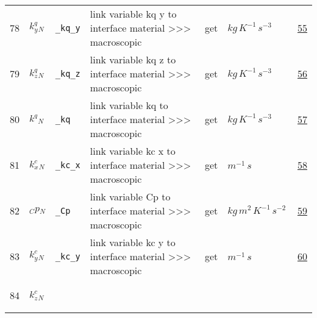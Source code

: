 \begin{longtable}{|p{1cm}|p{2.5cm}|p{4.5cm}|p{8cm}|p{3.0cm}|p{3cm}|p{1cm}|}
    78
             & \hypertarget{"v:78"}{ $ {{k^q_y}}{_{N}} $}
             & \verb|_kq_y|
             & link variable kq y to interface material >>> macroscopic
             & \begin{lay}get \end{lay}
             & $ kg \,K^{-1} \,s^{-3} \, $
             & \hyperlink{"e:55"}{ 55 }
                 \\
    79
             & \hypertarget{"v:79"}{ $ {{k^q_z}}{_{N}} $}
             & \verb|_kq_z|
             & link variable kq z to interface material >>> macroscopic
             & \begin{lay}get \end{lay}
             & $ kg \,K^{-1} \,s^{-3} \, $
             & \hyperlink{"e:56"}{ 56 }
                 \\
    80
             & \hypertarget{"v:80"}{ $ {{k^q}}{_{N}} $}
             & \verb|_kq|
             & link variable kq to interface material >>> macroscopic
             & \begin{lay}get \end{lay}
             & $ kg \,K^{-1} \,s^{-3} \, $
             & \hyperlink{"e:57"}{ 57 }
                 \\
    81
             & \hypertarget{"v:81"}{ $ {{k^c_x}}{_{N}} $}
             & \verb|_kc_x|
             & link variable kc x to interface material >>> macroscopic
             & \begin{lay}get \end{lay}
             & $ m^{-1} \,s \, $
             & \hyperlink{"e:58"}{ 58 }
                 \\
    82
             & \hypertarget{"v:82"}{ $ {_Cp}{_{N}} $}
             & \verb|_Cp|
             & link variable Cp to interface material >>> macroscopic
             & \begin{lay}get \end{lay}
             & $ kg \,m^{2} \,K^{-1} \,s^{-2} \, $
             & \hyperlink{"e:59"}{ 59 }
                 \\
    83
             & \hypertarget{"v:83"}{ $ {{k^c_y}}{_{N}} $}
             & \verb|_kc_y|
             & link variable kc y to interface material >>> macroscopic
             & \begin{lay}get \end{lay}
             & $ m^{-1} \,s \, $
             & \hyperlink{"e:60"}{ 60 }
                 \\
    84
             & \hypertarget{"v:84"}{ $ {{k^c_z}}{_{N}} $}

\end{longtable}
